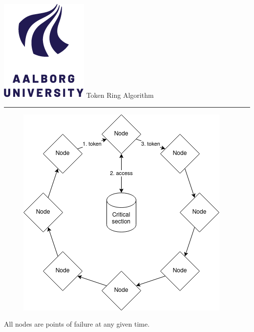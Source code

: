 \documentclass[aspectratio=1610,17pt,utf8]{beamer}
\newcommand{\regularframe}[1]{\color{black}\includegraphics[width=.05\textwidth]{figures/aau.png} #1\\\hrule}
\begin{document}
\begin{frame}{\regularframe{Token Ring Algorithm}}
    \begin{minipage}{.45\textwidth}
        \begin{figure}
            \includegraphics[width=\textwidth]{figures/1-token.png}
        \end{figure}
    \end{minipage}
    \begin{minipage}{.5\textwidth}
        \tiny{All nodes are points of failure at any given time.}
    \end{minipage}
\end{frame}

\end{document}
